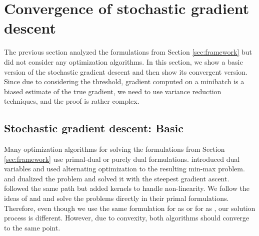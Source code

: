 \section{Convergence of stochastic gradient descent}\label{sec:convergence}

The previous section analyzed the formulations from Section \ref{sec:framework} but did not consider any optimization algorithms. In this section, we show a basic version of the stochastic gradient descent and then show its convergent version. Since due to considering the threshold, gradient computed on a minibatch is a biased estimate of the true gradient, we need to use variance reduction techniques, and the proof is rather complex.

\subsection{Stochastic gradient descent: Basic}

Many optimization algorithms for solving the formulations from Section \ref{sec:framework} use primal-dual or purely dual formulations. \cite{eban2017scalable} introduced dual variables and used alternating optimization to the resulting min-max problem.  \cite{li2014top} and \cite{zhang2018tau} dualized the problem and solved it with the steepest gradient ascent. \cite{macha2020nonlinear} followed the same path but added kernels to handle non-linearity. We follow the ideas of \cite{mackey2018constrained} and \cite{adam2019machine} and solve the problems directly in their primal formulations. Therefore, even though we use the same formulation for \TopPush as \cite{li2014top} or for \tauFPL as \cite{zhang2018tau}, our solution process is different. However, due to convexity, both algorithms should converge to the same point.

